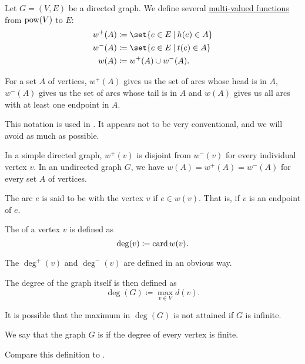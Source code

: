 \begin{definition}\label{def:graph_incidence}
  Let \( G = (V, E) \) be a directed graph. We define several \hyperref[def:multi_valued_function]{multi-valued functions} from \( \operatorname{pow}(V) \) to \( E \):
  \begin{align*}
     w^+(A) &\coloneqq \set{ e \in E \given h(e) \in A } \\
     w^-(A) &\coloneqq \set{ e \in E \given t(e) \in A } \\
     w(A)   &\coloneqq w^+(A) \cup w^-(A).
  \end{align*}

  For a set \( A \) of vertices, \( w^+(A) \) gives us the set of arcs whose head is in \( A \), \( w^-(A) \) gives us the set of arcs whose tail is in \( A \) and \( w(A) \) gives us all arcs with at least one endpoint in \( A \).

  This notation is used in \cite[ch. 1, sec. 1.4]{GondranMinoux1984Graphs}. It appears not to be very conventional, and we will avoid as much as possible.

  In a simple directed graph, \( w^+(v) \) is disjoint from \( w^-(v) \) for every individual vertex \( v \). In an undirected graph \( G \), we have \( w(A) = w^+(A) = w^-(A) \) for every set \( A \) of vertices.

  \begin{thmenum}
     The arc \( e \) is said to be  with the vertex \( v \) if \( e \in w(v) \). That is, if \( v \) is an endpoint of \( e \).

     The  of a vertex \( v \) is defined as
    \begin{equation*}
      \deg(v) \coloneqq \operatorname{card} w(v).
    \end{equation*}

    The  \( \deg^+(v) \) and  \( \deg^-(v) \) are defined in an obvious way.

    The degree of the graph itself is then defined as
    \begin{equation*}
      \deg(G) \coloneqq \max_{v \in V} d(v).
    \end{equation*}

    It is possible that the maximum in \( \deg(G) \) is not attained if \( G \) is infinite.

     We say that the graph \( G \) is  if the degree of every vertex is finite.

    Compare this definition to .
  \end{thmenum}
\end{definition}

